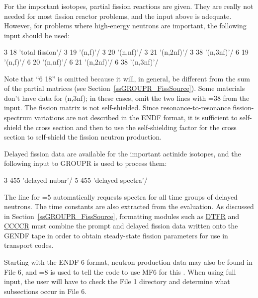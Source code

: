 \noindent
For the important isotopes, partial fission reactions are given.  They
are really not needed for most fission reactor problems, and the input
above is adequate.  However, for problems where high-energy neutrons
are important, the following input should be used:

\small
\begin{ccode}

   3 18 'total fission'/
   3 19 '(n,f)'/
   3 20 '(n,nf)'/
   3 21 '(n,2nf)'/
   3 38 '(n,3nf)'/
   6 19 '(n,f)'/
   6 20 '(n,nf)'/
   6 21 '(n,2nf)'/
   6 38 '(n,3nf)'/

\end{ccode}
\normalsize

\noindent
Note that ``6 18'' is omitted because it will, in general, be different
from the sum of the partial matrices (see Section~\ref{ssGROUPR_FissSource}).
Some materials don't have data for (n,3nf); in these cases, omit the two
lines with =38 from the input.  The fission matrix is not
self-shielded.  Since resonance-to-resonance fission-spectrum variations
are not described in the ENDF format, it is sufficient to self-shield
the cross section and then to use the self-shielding factor for the
cross section to self-shield the fission neutron production.

Delayed fission data are available for the important actinide isotopes,
and the following input to GROUPR is used to process them:

\small
\begin{ccode}

   3 455 'delayed nubar'/
   5 455 'delayed spectra'/

\end{ccode}
\normalsize

\noindent
The line for =5 automatically requests spectra for all time groups
of delayed neutrons.  The time constants are also extracted from
the evaluation.  As discussed in Section~\ref{ssGROUPR_FissSource},
formatting modules such as \hyperlink{sDTFRhy}{DTFR} and
\hyperlink{sCCCCRhy}{CCCCR} must combine the prompt and delayed
fission data written onto the GENDF tape in order to obtain steady-state
fission parameters for use in transport codes.

Starting with the ENDF-6 format, neutron production data may also be
found in File 6, and =8 is used to tell the code
to use MF6 for this .  When using full input, the user
will have to check the File 1 directory and determine what subsections
occur in File 6.

